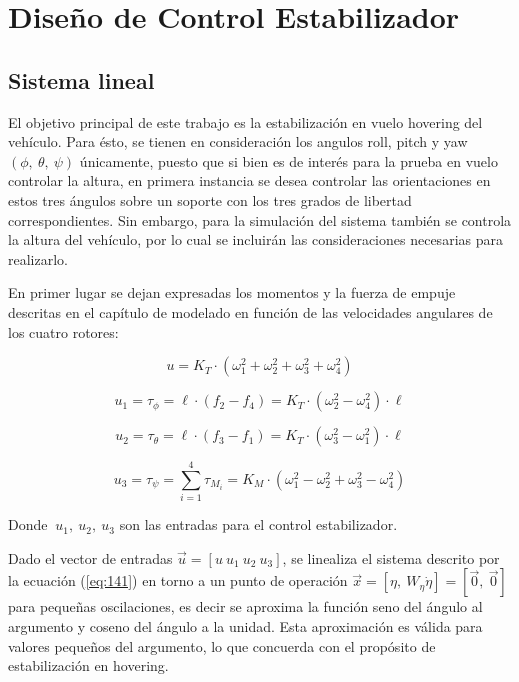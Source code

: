 \documentclass[\main/main.tex]{subfiles}
\begin{document}
\section{Diseño de Control Estabilizador}\label{Diseo de Control Estabilizador}
\subsection{Sistema lineal}

El objetivo principal de este trabajo es la estabilización en vuelo
hovering del vehículo. Para ésto, se tienen en consideración los angulos
roll, pitch y yaw $(\phi,\ \theta,\ \psi)$ únicamente, puesto que
si bien es de interés para la prueba en vuelo controlar la altura,
en primera instancia se desea controlar las orientaciones en estos
tres ángulos sobre un soporte con los tres grados de libertad correspondientes.
Sin embargo, para la simulación del sistema también se controla la
altura del vehículo, por lo cual se incluirán las consideraciones
necesarias para realizarlo.

En primer lugar se dejan expresadas los momentos y la fuerza de empuje
descritas en el capítulo de modelado en función de las velocidades
angulares de los cuatro rotores:

\begin{equation}
u=K_{T}\cdot(\omega_{1}^{2}+\omega_{2}^{2}+\omega_{3}^{2}+\omega_{4}^{2})
\end{equation}

\begin{equation}
u_{1}=\tau_{\phi}=\ell\cdot(f_{2}-f_{4})=K_{T}\cdot(\omega_{2}^{2}-\omega_{4}^{2})\cdot\ell
\end{equation}

\begin{equation}
u_{2}=\tau_{\theta}=\ell\cdot(f_{3}-f_{1})=K_{T}\cdot(\omega_{3}^{2}-\omega_{1}^{2})\cdot\ell
\end{equation}

\begin{equation}
u_{3}=\tau_{\psi}=\sum_{i=1}^{4}\tau_{M_{i}}=K_{M}\cdot(\omega_{1}^{2}-\omega_{2}^{2}+\omega_{3}^{2}-\omega_{4}^{2})
\end{equation}

Donde $\ u_{1},\ u_{2},\ u_{3}$ son las entradas para el control
estabilizador. 

Dado el vector de entradas $\vec{u}=[u\ u_{1}\ u_{2}\ u_{3}]$, se
linealiza el sistema descrito por la ecuación  (\ref{eq:141}) en torno a un punto
de operación $\vec{x}=[\eta,\ W_{\eta}\dot{\eta}]=[\vec{0},\ \vec{0}]$
para pequeñas oscilaciones, es decir se aproxima la función seno del
ángulo al argumento y coseno del ángulo a la unidad. Esta aproximación
es válida para valores pequeños del argumento, lo que concuerda con
el propósito de estabilización en hovering.
\end{document}

